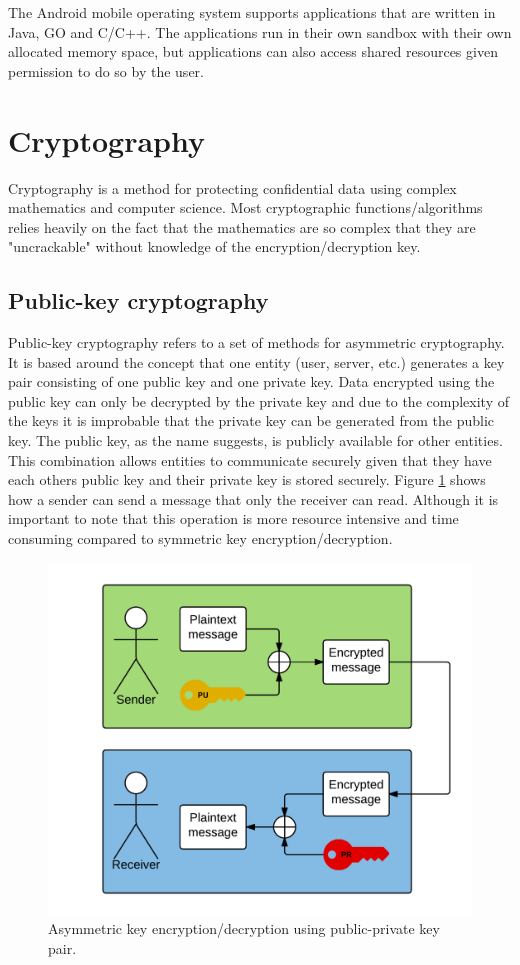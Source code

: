 The Android mobile operating system supports applications that are written in Java, GO and C/C++. The applications run in their own sandbox with their own allocated memory space, but applications can also access shared resources given permission to do so by the user.

\section{Cryptography}
Cryptography is a method for protecting confidential data using complex mathematics and computer science. Most cryptographic functions/algorithms relies heavily on the fact that the mathematics are so complex that they are "uncrackable" without knowledge of the encryption/decryption key.

\subsection{Public-key cryptography}
Public-key cryptography refers to a set of methods for asymmetric cryptography. It is based around the concept that one entity (user, server, etc.) generates a key pair consisting of one public key and one private key. Data encrypted using the public key can only be decrypted by the private key and due to the complexity of the keys it is improbable that the private key can be generated from the public key. The public key, as the name suggests, is publicly available for other entities. This combination allows entities to communicate securely given that they have each others public key and their private key is stored securely. Figure \ref{fig:encrypt_basic} shows how a sender can send a message that only the receiver can read. Although it is important to note that this operation is more resource intensive and time consuming compared to symmetric key encryption/decryption.

\begin{figure}[h!]
  \captionsetup{justification=centering,margin=1.5cm}
  \caption{Asymmetric key encryption/decryption using public-private key pair.}
  \label{fig:encrypt_basic}
  \centering
    \includegraphics[width=1\textwidth]{images/encrypt_basic.png}
\end{figure}

